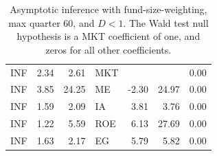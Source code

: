 \documentclass[12pt]{article}
\begin{document}
\begin{table}[ht]
\begin{tabular}{lrrlrrr}
		\hline
		INF & 2.34 & 2.61 & MKT &  &  & 0.00 \\ 
		INF & 3.85 & 24.25 & ME & -2.30 & 24.97 & 0.00 \\ 
		INF & 1.59 & 2.09 & IA & 3.81 & 3.76 & 0.00 \\ 
		INF & 1.22 & 5.59 & ROE & 6.13 & 27.69 & 0.00 \\ 
		INF & 1.63 & 2.17 & EG & 5.79 & 5.82 & 0.00 \\ 
		\hline
		\hline
	\end{tabular}
	\caption{Asymptotic inference with fund-size-weighting, max quarter 60, and $D<1$. The Wald test null hypothesis is a MKT coefficient of one, and zeros for all other coefficients.}
	\label{tab:ai_60_fw_indep}
\end{table}




\end{document}
